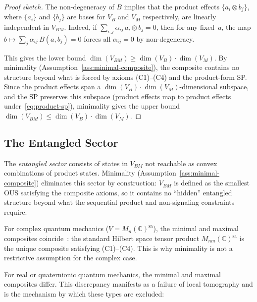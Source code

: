\begin{proof}[Proof sketch]
The non-degeneracy of $B$ implies that the product effects
$\{a_i\otimes b_j\}$, where $\{a_i\}$ and $\{b_j\}$ are bases for $V_B$
and $V_M$ respectively, are linearly independent in $V_{BM}$. Indeed, if
$\sum_{i,j}\alpha_{ij}\,a_i\otimes b_j = 0$, then for any fixed~$a$,
the map $b \mapsto \sum_j \alpha_{ij}\,B(a,b_j) = 0$ forces all
$\alpha_{ij}=0$ by non-degeneracy.

This gives the lower bound $\dim(V_{BM}) \ge \dim(V_B)\cdot\dim(V_M)$.
By minimality (Assumption~\ref{ass:minimal-composite}), the composite
contains no structure beyond what is forced by axioms (C1)--(C4) and
the product-form SP. Since the product effects span a
$\dim(V_B)\cdot\dim(V_M)$-dimensional subspace, and the SP preserves
this subspace (product effects map to product effects
under~\eqref{eq:product-sp}), minimality gives the upper bound
$\dim(V_{BM}) \le \dim(V_B)\cdot\dim(V_M)$.
\end{proof}

\subsection{The Entangled Sector}\label{subsec:entangled}

The \emph{entangled sector} consists of states in $V_{BM}$ not reachable
as convex combinations of product states. Minimality
(Assumption~\ref{ass:minimal-composite}) eliminates this sector by
construction: $V_{BM}$ is defined as the smallest OUS satisfying the
composite axioms, so it contains no ``hidden'' entangled structure beyond
what the sequential product and non-signaling constraints require.

For complex quantum mechanics ($V = M_n(\mathbb{C})^{\mathrm{sa}}$),
the minimal and maximal composites
coincide~\cite{Barnum2023}: the standard Hilbert space
tensor product $M_{nm}(\mathbb{C})^{\mathrm{sa}}$ is the unique composite
satisfying (C1)--(C4). This is why minimality is not a restrictive
assumption for the complex case.

For real or quaternionic quantum mechanics, the minimal and maximal
composites differ. This discrepancy manifests as a failure of local
tomography and is the mechanism by which these types are excluded:

